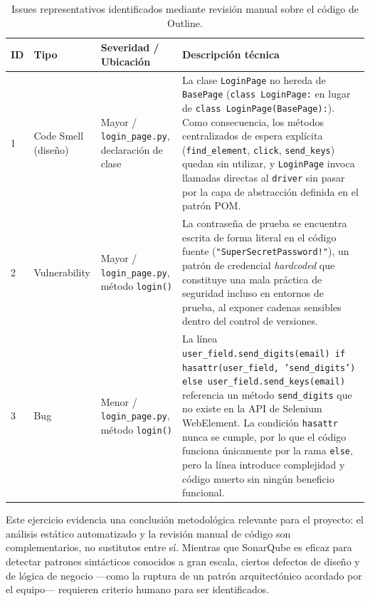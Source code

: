 \documentclass[12pt,oneside]{report}
\begin{document}
\begin{table}[H]
\centering
\caption{Issues representativos identificados mediante revisión manual sobre el código de Outline.}
\small
\begin{tabularx}{\textwidth}{|p{1.3cm}|p{2.3cm}|p{2.6cm}|X|}
\hline
\textbf{ID} & \textbf{Tipo} & \textbf{Severidad / Ubicación} & \textbf{Descripción técnica} \\
\hline
1 & Code Smell (diseño) & Mayor / \texttt{login\_page.py}, declaración de clase & La clase \texttt{LoginPage} no hereda de \texttt{BasePage} (\texttt{class LoginPage:} en lugar de \texttt{class LoginPage(BasePage):}). Como consecuencia, los métodos centralizados de espera explícita (\texttt{find\_element}, \texttt{click}, \texttt{send\_keys}) quedan sin utilizar, y \texttt{LoginPage} invoca llamadas directas al \texttt{driver} sin pasar por la capa de abstracción definida en el patrón POM. \\
\hline
2 & Vulnerability & Mayor / \texttt{login\_page.py}, método \texttt{login()} & La contraseña de prueba se encuentra escrita de forma literal en el código fuente (\texttt{"SuperSecretPassword!"}), un patrón de credencial \textit{hardcoded} que constituye una mala práctica de seguridad incluso en entornos de prueba, al exponer cadenas sensibles dentro del control de versiones. \\
\hline
3 & Bug & Menor / \texttt{login\_page.py}, método \texttt{login()} & La línea \texttt{user\_field.send\_digits(email) if hasattr(user\_field, 'send\_digits') else user\_field.send\_keys(email)} referencia un método \texttt{send\_digits} que no existe en la API de Selenium WebElement. La condición \texttt{hasattr} nunca se cumple, por lo que el código funciona únicamente por la rama \texttt{else}, pero la línea introduce complejidad y código muerto sin ningún beneficio funcional. \\
\hline
\end{tabularx}
\end{table}

Este ejercicio evidencia una conclusión metodológica relevante para el proyecto: el análisis estático automatizado y la revisión manual de código son complementarios, no sustitutos entre sí. Mientras que SonarQube es eficaz para detectar patrones sintácticos conocidos a gran escala, ciertos defectos de diseño y de lógica de negocio —como la ruptura de un patrón arquitectónico acordado por el equipo— requieren criterio humano para ser identificados.


\end{document}
